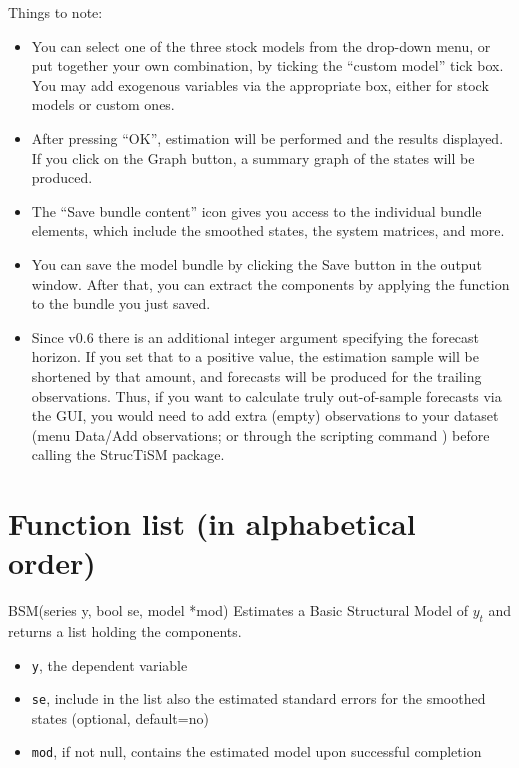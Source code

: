 \documentclass[a4paper,10pt]{article}
\begin{document}
Things to note:
\begin{itemize}
\item You can select one of the three stock models from the drop-down
  menu, or put together your own combination, by ticking the ``custom
  model'' tick box. You may add exogenous variables via the
  appropriate box, either for stock models or custom ones.
\item After pressing ``OK'', estimation will be performed and the
  results displayed. If you click on the Graph button, a summary graph
  of the states will be produced.
\item The ``Save bundle content'' icon gives you access to the
  individual bundle elements, which include the smoothed states, the
  system matrices, and more.
\item You can save the model bundle by clicking the Save button in the
  output window. After that, you can extract the components by
  applying the  function to the bundle you just
  saved.
\item Since v0.6 there is an additional integer argument specifying
  the forecast horizon. If you set that to a positive value, the
  estimation sample will be shortened by that amount, and forecasts
  will be produced for the trailing observations. Thus, if you want to
  calculate truly out-of-sample forecasts via the GUI, you would need 
  to add extra (empty) observations to your dataset (menu Data/Add 
  observations; or through the scripting command )
  before calling the StrucTiSM package.
\end{itemize}


\section{Function list (in alphabetical order)}
\label{sec:funcdoc}

\begin{funcdoc}{BSM(series y, bool se, model *mod)}
  Estimates a Basic Structural Model of $y_t$ and returns a list
  holding the components.
  \begin{itemize}
  \item \texttt{y}, the dependent variable
  \item \texttt{se}, include in the list also the estimated standard
    errors for the smoothed states (optional, default=no)
  \item \texttt{mod}, if not null, contains the estimated model upon
    successful completion
  \end{itemize}
\end{funcdoc}
\end{document}
